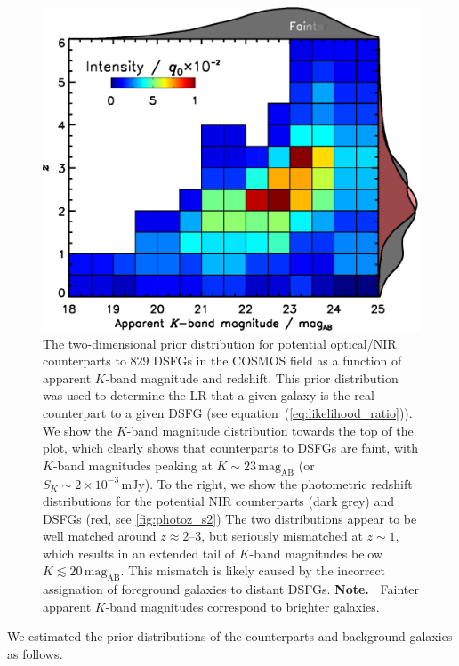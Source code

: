 \documentclass[a4paper, fleqn, usenatbib]{mnras}
\newcommand{\magab}{\text{mag}_{\text{AB}}}
\newcommand{\millijanksy}{\text{mJy}}
\begin{document}
\begin{figure}
    \includegraphics[width=1.075\columnwidth]{q_prior}
    \caption{The two-dimensional prior distribution for potential optical/NIR counterparts to $829$ DSFGs in the COSMOS field as a function of apparent $K$-band magnitude and redshift.
    This prior distribution was used to determine the LR that a given galaxy is the real counterpart to a given DSFG (see equation~(\ref{eq:likelihood_ratio})).
    We show the $K$-band magnitude distribution towards the top of the plot, which clearly shows that counterparts to DSFGs are faint, with $K$-band magnitudes peaking at $K\sim23\,\magab{}$ (or $S_{K}\sim2\times10^{-3}\,\millijanksy{}$).
    To the right, we show the photometric redshift distributions for the potential NIR counterparts (dark grey) and DSFGs (red, see \ref{fig:photoz_s2})
    The two distributions appear to be well matched around $z\approx2\text{--}3$, but seriously mismatched at $z\sim1$, which results in an extended tail of $K$-band magnitudes below $K\lesssim20\,\magab{}$.
    This mismatch is likely caused by the incorrect assignation of foreground galaxies to distant DSFGs.
    \textbf{Note.\ } Fainter apparent $K$-band magnitudes correspond to brighter galaxies.}
    \label{fig:q_prior}
\end{figure}

We estimated the prior distributions of the counterparts and background galaxies as follows.
\end{document}
